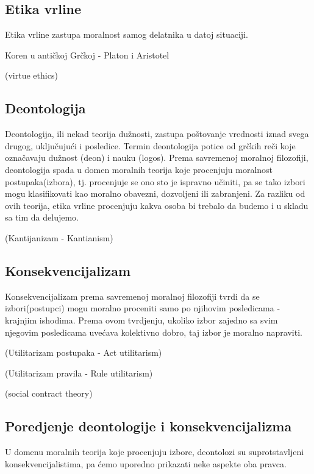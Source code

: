 \documentclass[a4paper]{article}
\begin{document}
\subsection{Etika vrline}

Etika vrline zastupa moralnost samog delatnika u datoj situaciji. 

Koren u antičkoj Grčkoj - Platon i Aristotel

(virtue ethics)

\subsection{Deontologija}
Deontologija, ili nekad teorija dužnosti, zastupa poštovanje vrednosti iznad svega drugog, uključujući i posledice. 
Termin deontologija potice od grčkih reči koje označavaju dužnost (deon) i nauku (logos). Prema savremenoj moralnoj filozofiji, deontologija spada u domen moralnih teorija koje procenjuju moralnost postupaka(izbora), tj. procenjuje se ono sto je ispravno učiniti, pa se tako izbori mogu klasifikovati kao moralno obavezni, dozvoljeni ili zabranjeni. Za razliku od ovih teorija, etika vrline procenjuju kakva osoba bi trebalo da budemo i u skladu sa tim da delujemo. 

(Kantijanizam - Kantianism)

\subsection{Konsekvencijalizam}
Konsekvencijalizam prema savremenoj moralnoj filozofiji tvrdi da se izbori(postupci) mogu moralno proceniti samo po njihovim posledicama - krajnjim ishodima. Prema ovom tvrdjenju, ukoliko izbor zajedno sa svim njegovim posledicama uvećava kolektivno dobro, taj izbor je moralno napraviti.

(Utilitarizam postupaka - Act utilitarism)

(Utilitarizam pravila - Rule utilitarism)

(social contract theory)

\subsection{Poredjenje deontologije i konsekvencijalizma}
U domenu moralnih teorija koje procenjuju izbore, deontolozi su suprotstavljeni konsekvencijalistima, pa ćemo uporedno prikazati neke aspekte oba pravca.
\end{document}
